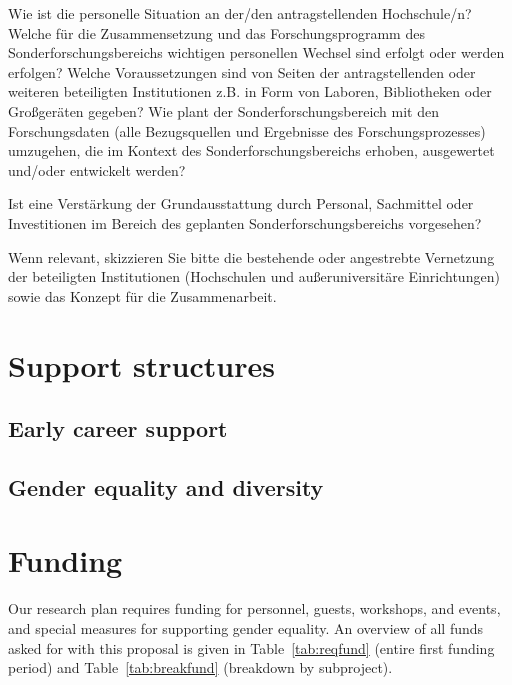 \begin{erklaerung}
Wie ist die personelle Situation an der/den antragstellenden
Hochschule/n? Welche für die Zusammensetzung und das Forschungsprogramm
des Sonderforschungsbereichs wichtigen personellen Wechsel sind erfolgt
oder werden erfolgen? Welche Voraussetzungen sind von Seiten der
antragstellenden oder weiteren beteiligten Institutionen z.B. in Form
von Laboren, Bibliotheken oder Großgeräten gegeben? Wie plant der
Sonderforschungsbereich mit den Forschungsdaten (alle Bezugsquellen und
Ergebnisse des Forschungsprozesses) umzugehen, die im Kontext des
Sonderforschungsbereichs erhoben, ausgewertet und/oder entwickelt
werden?

Ist eine Verstärkung der Grundausstattung durch Personal,
Sachmittel oder Investitionen im Bereich des geplanten
Sonderforschungsbereichs vorgesehen?

Wenn relevant, skizzieren Sie bitte die bestehende oder
angestrebte Vernetzung der beteiligten Institutionen (Hochschulen und
außeruniversitäre Einrichtungen) sowie das Konzept für die
Zusammenarbeit.
\end{erklaerung}

\section{Support structures}

\blindtext
\subsection{Early career support}

\blindtext

\subsection{Gender equality and diversity}

\blindtext

\section{Funding}
\label{sec:funding}

Our research plan requires funding for personnel, guests, workshops,
and events, and special measures for supporting gender equality. An
overview of all funds asked for with this proposal is given in
Table~\ref{tab:reqfund} (entire first funding period) and
Table~\ref{tab:breakfund} (breakdown by subproject).



